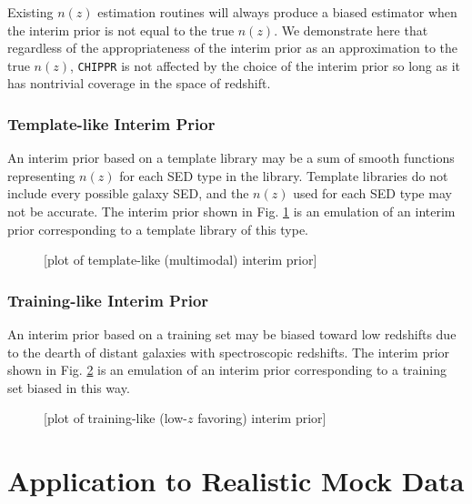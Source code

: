 \documentclass[iop]{emulateapj}
\newcommand{\chippr}{\texttt{CHIPPR} }
\begin{document}
Existing $n(z)$ estimation routines will always produce a biased estimator when 
the interim prior is not equal to the true $n(z)$.  We demonstrate here that 
regardless of the appropriateness of the interim prior as an approximation to 
the true $n(z)$, \chippr is not affected by the choice of the interim prior so 
long as it has nontrivial coverage in the space of redshift.

\subsubsection{Template-like Interim Prior}
\label{sec:tempintpr}

An interim prior based on a template library may be a sum of smooth functions 
representing $n(z)$ for each SED type in the library.  Template libraries do 
not include every possible galaxy SED, and the $n(z)$ used for each SED type 
may not be accurate.  The interim prior shown in Fig. \ref{fig:tempintpr} is an 
emulation of an interim prior corresponding to a template library of this type.

\begin{figure}
	\begin{center}
		\caption{[plot of template-like (multimodal) interim prior]}
		\label{fig:tempintpr}
	\end{center}
\end{figure}

\subsubsection{Training-like Interim Prior}
\label{sec:trainintpr}

An interim prior based on a training set may be biased toward low redshifts due 
to the dearth of distant galaxies with spectroscopic redshifts.  The interim 
prior shown in Fig. \ref{fig:trainintpr} is an emulation of an interim prior 
corresponding to a training set biased in this way.

\begin{figure}
	\begin{center}
		\caption{[plot of training-like (low-$z$ favoring) interim 
prior]}
		\label{fig:trainintpr}
	\end{center}
\end{figure}

\section{Application to Realistic Mock Data}
\label{sec:application}
\end{document}
